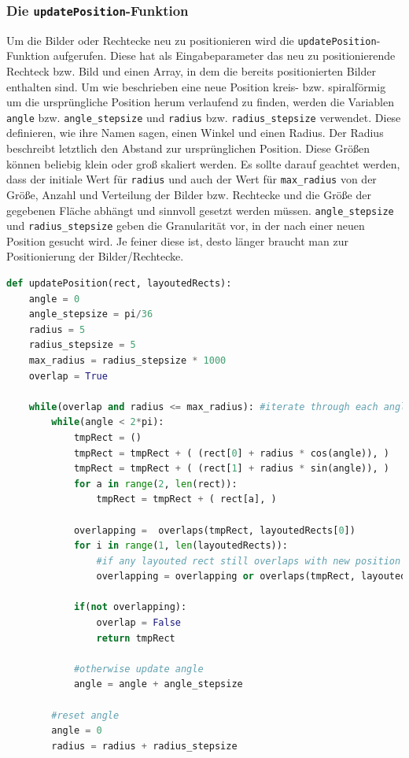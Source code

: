 \documentclass[12pt, ngerman, utf8]{article}
\begin{document}
\subsubsection{Die \texttt{updatePosition}-Funktion}
Um die Bilder oder Rechtecke neu zu positionieren wird die \texttt{updatePosition}-Funktion aufgerufen. Diese hat als Eingabeparameter das neu zu positionierende Rechteck bzw. Bild und einen Array, in dem die bereits positionierten Bilder enthalten sind. Um wie beschrieben eine neue Position kreis- bzw. spiralförmig um die ursprüngliche Position herum verlaufend zu finden, werden die Variablen \texttt{angle} bzw. \texttt{angle\_stepsize} und \texttt{radius} bzw. \texttt{radius\_stepsize} verwendet. Diese definieren, wie ihre Namen sagen, einen Winkel und einen Radius. Der Radius beschreibt letztlich den Abstand zur ursprünglichen Position. Diese Größen können beliebig klein oder groß skaliert werden. Es sollte darauf geachtet werden, dass der initiale Wert für \texttt{radius} und auch der Wert für \texttt{max\_radius} von der Größe, Anzahl und Verteilung der Bilder bzw. Rechtecke und die Größe der gegebenen Fläche abhängt und sinnvoll gesetzt werden müssen. \texttt{angle\_stepsize} und \texttt{radius\_stepsize} geben die Granularität vor, in der nach einer neuen Position gesucht wird. Je feiner diese ist, desto länger braucht man zur Positionierung der Bilder/Rechtecke.\\
\begin{lstlisting}[language=Python, caption={\texttt{updatePosition}-Funktion zur Positionierung der Rechtecke für \emph{RWordle}},label=rot1]
def updatePosition(rect, layoutedRects):
    angle = 0
    angle_stepsize = pi/36
    radius = 5
    radius_stepsize = 5
    max_radius = radius_stepsize * 1000
    overlap = True
    
    while(overlap and radius <= max_radius): #iterate through each angle for radius increased by radius_stepsize until max_radius
        while(angle < 2*pi):
            tmpRect = ()
            tmpRect = tmpRect + ( (rect[0] + radius * cos(angle)), )
            tmpRect = tmpRect + ( (rect[1] + radius * sin(angle)), )
            for a in range(2, len(rect)):
                tmpRect = tmpRect + ( rect[a], )
            
            overlapping =  overlaps(tmpRect, layoutedRects[0])
            for i in range(1, len(layoutedRects)):
                #if any layouted rect still overlaps with new position of tmpRect
                overlapping = overlapping or overlaps(tmpRect, layoutedRects[i])
            
            if(not overlapping):
                overlap = False
                return tmpRect
            
            #otherwise update angle
            angle = angle + angle_stepsize
            
        #reset angle
        angle = 0
        radius = radius + radius_stepsize
\end{lstlisting}
\end{document}
